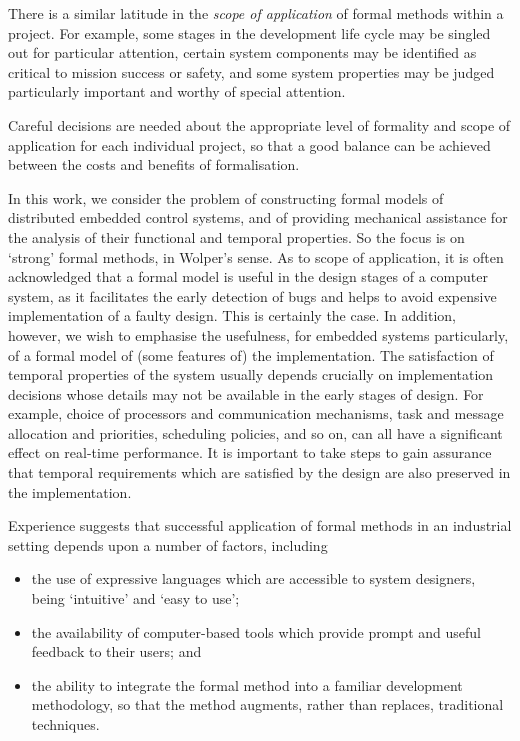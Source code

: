 There is a similar latitude in the \emph{scope of application} of
formal methods within a project. For example, some stages in the
development life cycle may be singled out for particular attention,
certain system components may be identified as critical to mission
success or safety, and some system properties may be judged
particularly important and worthy of special attention.

Careful decisions are needed about the appropriate level of formality
and scope of application for each individual project, so that a good
balance can be achieved between the costs and benefits of formalisation.

In this work, we consider the problem of constructing formal models of
distributed embedded control systems, and of providing mechanical
assistance for the analysis of their functional and temporal
properties.  So the focus is on `strong' formal methods, in Wolper's
sense. As to scope of application, it is often acknowledged that a
formal model is useful in the design stages of a computer system, as
it facilitates the early detection of bugs and helps to avoid
expensive implementation of a faulty design. This is certainly the
case. In addition, however, we wish to emphasise the usefulness, for
embedded systems particularly, of a formal model of (some features of)
the implementation. The satisfaction of temporal properties of the
system usually depends crucially on implementation decisions whose
details may not be available in the early stages of design.  For
example, choice of processors and communication mechanisms, task and
message allocation and priorities, scheduling policies, and so on, can
all have a significant effect on real-time performance. It is
important to take steps to gain assurance that temporal requirements
which are satisfied by the design are also preserved in the implementation.

Experience suggests that successful application of formal methods in
an industrial setting depends upon a number of factors, including
\begin{itemize}
\item the use of expressive languages which are accessible to system
designers, being `intuitive' and `easy to use';
\item the availability of computer-based tools which provide prompt and 
useful feedback to their users; and
\item the ability to integrate the formal method into a familiar development
methodology, so that the method augments, rather than replaces,
traditional techniques.
\end{itemize} 

